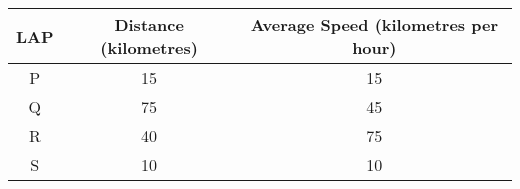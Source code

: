 
\begin{table}[h!]
    \centering
    \begin{tabular}{|c|c|c|}
        \hline
        \textbf{LAP} & \textbf{Distance} (kilometres) & \textbf{Average Speed} (kilometres per hour) \\
        \hline
        P & 15 & 15 \\
        \hline
        Q & 75 & 45 \\
        \hline
        R & 40 & 75 \\
        \hline
        S & 10 & 10 \\
        \hline
    \end{tabular}
\end{table}

